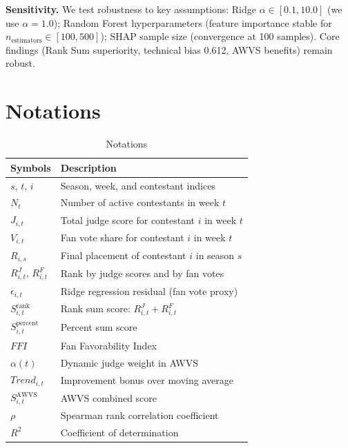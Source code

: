 \documentclass{mcmthesis}
\begin{document}
\textbf{Sensitivity.}
We test robustness to key assumptions: Ridge $\alpha \in [0.1, 10.0]$ (we use $\alpha = 1.0$); Random Forest hyperparameters (feature importance stable for $n_{\text{estimators}} \in [100, 500]$); SHAP sample size (convergence at 100 samples). Core findings (Rank Sum superiority, technical bias 0.612, AWVS benefits) remain robust.
\fi

\section{Notations}

\begin{table}[h]
\centering
\caption{Notations}
\begin{tabular}{p{3.5cm}p{9cm}}
\toprule
\centering Symbols & \centering Description \arraybackslash \\
\midrule
\centering $s$, $t$, $i$ & \centering Season, week, and contestant indices \arraybackslash \\
\centering $N_t$ & \centering Number of active contestants in week $t$ \arraybackslash \\
\centering $J_{i,t}$ & \centering Total judge score for contestant $i$ in week $t$ \arraybackslash \\
\centering $V_{i,t}$ & \centering Fan vote share for contestant $i$ in week $t$ \arraybackslash \\
\centering $R_{i,s}$ & \centering Final placement of contestant $i$ in season $s$ \arraybackslash \\
\centering $R^J_{i,t}$, $R^F_{i,t}$ & \centering Rank by judge scores and by fan votes \arraybackslash \\
\centering $\epsilon_{i,t}$ & \centering Ridge regression residual (fan vote proxy) \arraybackslash \\
\centering $S^{\text{rank}}_{i,t}$ & \centering Rank sum score: $R^J_{i,t} + R^F_{i,t}$ \arraybackslash \\
\centering $S^{\text{percent}}_{i,t}$ & \centering Percent sum score \arraybackslash \\
\centering $FFI$ & \centering Fan Favorability Index \arraybackslash \\
\centering $\alpha(t)$ & \centering Dynamic judge weight in AWVS \arraybackslash \\
\centering $Trend_{i,t}$ & \centering Improvement bonus over moving average \arraybackslash \\
\centering $S^{\text{AWVS}}_{i,t}$ & \centering AWVS combined score \arraybackslash \\
\centering $\rho$ & \centering Spearman rank correlation coefficient \arraybackslash \\
\centering $R^2$ & \centering Coefficient of determination \arraybackslash \\
\bottomrule
\end{tabular}
\end{table}
\end{document}
